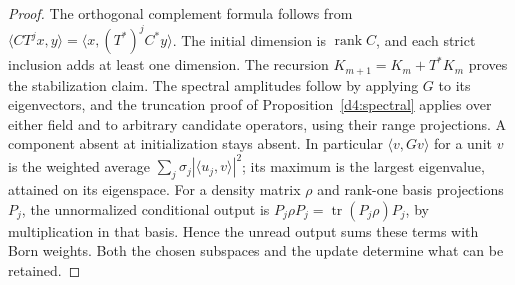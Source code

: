 \documentclass[11pt,reqno]{amsart}
\theoremstyle{definition}
\theoremstyle{remark}
\numberwithin{equation}{section}
\begin{document}
\begin{proof}
The orthogonal complement formula follows from
\(\langle C T^j x,y\rangle=\langle x,(T^*)^j C^*y\rangle\).
The initial dimension is \(\operatorname{rank}C\), and each strict
inclusion adds at least one dimension. The recursion
\(K_{m+1}=K_m+T^*K_m\) proves the stabilization claim. The spectral
amplitudes follow by applying \(G\) to its eigenvectors, and the
truncation proof of Proposition~\ref{d4:spectral} applies over either
field and to arbitrary candidate operators, using their range
projections. A component absent at initialization stays absent. In particular
\(\langle v,Gv\rangle\) for a unit \(v\) is the weighted average
\(\sum_j\sigma_j|\langle u_j,v\rangle|^2\); its maximum is the
largest eigenvalue, attained on its eigenspace. For a density
matrix \(\rho\) and rank-one basis projections \(P_j\), the
unnormalized conditional output is
\(P_j\rho P_j=\operatorname{tr}(P_j\rho)P_j\), by multiplication
in that basis. Hence the unread output sums these terms with Born
weights. Both the chosen subspaces and the update determine what
can be retained.
\end{proof}
\end{document}
